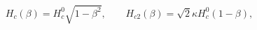 \begin{equation}
H_c(\beta)= H_c^0 \sqrt{1- \beta^2}, \qquad H_{c2}(\beta) = \sqrt{2} 
\kappa H_c^0 ( 1- \beta),
\end{equation}

